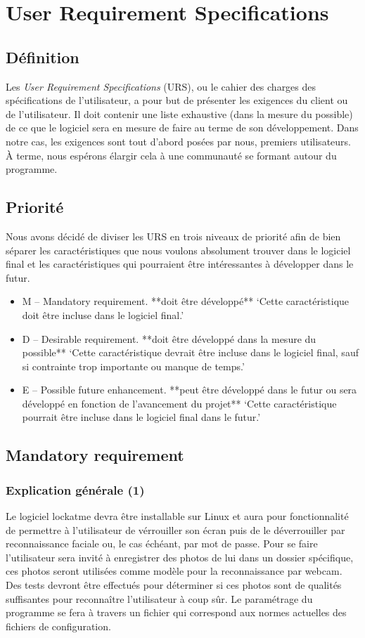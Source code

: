\chapter{User Requirement Specifications}
\newpage

\section{Définition}
Les \emph{User Requirement Specifications} (URS), ou le cahier des charges des
spécifications de l’utilisateur, a pour but de présenter les exigences du
client ou de l’utilisateur. Il doit contenir une liste exhaustive
(dans la mesure du possible) de ce que le logiciel sera en mesure de faire au
terme de son développement. Dans notre cas, les exigences sont tout d’abord
posées par nous, premiers utilisateurs. À terme, nous espérons élargir cela à
une communauté se formant autour du programme.

\section{Priorité}
Nous avons décidé de diviser les URS en trois niveaux de priorité afin de bien
séparer les caractéristiques que nous voulons absolument trouver dans le
logiciel final et les caractéristiques qui pourraient être intéressantes à
développer dans le futur.
\begin{itemize}
  \item{M – Mandatory requirement. **doit être développé**
‘Cette caractéristique doit être incluse dans le logiciel final.’}
  \item{D – Desirable requirement. **doit être développé dans la mesure du
  possible**
‘Cette caractéristique devrait être incluse dans le logiciel final, sauf si
contrainte trop importante ou manque de temps.’}
  \item{E – Possible future enhancement. **peut être développé dans le futur
  ou sera développé en fonction de l’avancement du projet**
‘Cette caractéristique pourrait être incluse dans le logiciel final dans le
futur.’}
\end{itemize}

\section{Mandatory requirement}
  \subsection{Explication générale (1)}
Le logiciel lockatme devra être installable sur Linux et aura pour
fonctionnalité de permettre à l’utilisateur de vérrouiller son écran puis de
le déverrouiller par reconnaissance faciale ou, le cas échéant, par mot de
passe. Pour se faire l’utilisateur sera invité à enregistrer des photos de
lui dans un dossier spécifique, ces photos seront utilisées comme modèle pour la
reconnaissance par webcam. Des tests devront être effectués pour déterminer si ces
photos sont de qualités suffisantes pour reconnaître l’utilisateur à coup sûr.
Le paramétrage du programme se fera à travers un fichier qui correspond aux
normes actuelles des fichiers de configuration.

